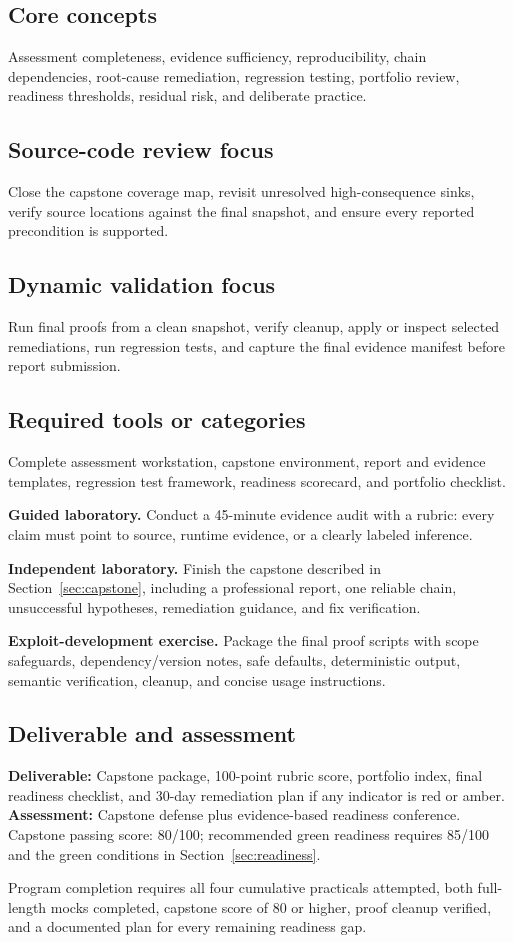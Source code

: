 \documentclass[11pt]{article}
\newcommand{\weekfield}[2]{%
  \Needspace{5\baselineskip}
  \subsection*{#1}
  #2
}
\newcommand{\deliverable}[1]{\textbf{Deliverable:} #1}
\newcommand{\assessment}[1]{\textbf{Assessment:} #1}
\begin{document}
\weekfield{Core concepts}{Assessment completeness, evidence sufficiency,
reproducibility, chain dependencies, root-cause remediation, regression testing,
portfolio review, readiness thresholds, residual risk, and deliberate practice.}

\weekfield{Source-code review focus}{Close the capstone coverage map, revisit
unresolved high-consequence sinks, verify source locations against the final
snapshot, and ensure every reported precondition is supported.}

\weekfield{Dynamic validation focus}{Run final proofs from a clean snapshot,
verify cleanup, apply or inspect selected remediations, run regression tests, and
capture the final evidence manifest before report submission.}

\weekfield{Required tools or categories}{Complete assessment workstation,
capstone environment, report and evidence templates, regression test framework,
readiness scorecard, and portfolio checklist.}

\begin{labbox}
\textbf{Guided laboratory.} Conduct a 45-minute evidence audit with a rubric:
every claim must point to source, runtime evidence, or a clearly labeled inference.

\textbf{Independent laboratory.} Finish the capstone described in
Section~\ref{sec:capstone}, including a professional report, one reliable chain,
unsuccessful hypotheses, remediation guidance, and fix verification.

\textbf{Exploit-development exercise.} Package the final proof scripts with
scope safeguards, dependency/version notes, safe defaults, deterministic output,
semantic verification, cleanup, and concise usage instructions.
\end{labbox}

\weekfield{Deliverable and assessment}{\deliverable{Capstone package, 100-point
rubric score, portfolio index, final readiness checklist, and 30-day remediation
plan if any indicator is red or amber.}
\assessment{Capstone defense plus evidence-based readiness conference. Capstone
passing score: 80/100; recommended green readiness requires 85/100 and the green
conditions in Section~\ref{sec:readiness}.}}

\begin{checkpoints}
Program completion requires all four cumulative practicals attempted, both full-
length mocks completed, capstone score of 80 or higher, proof cleanup verified,
and a documented plan for every remaining readiness gap.
\end{checkpoints}
\end{document}
